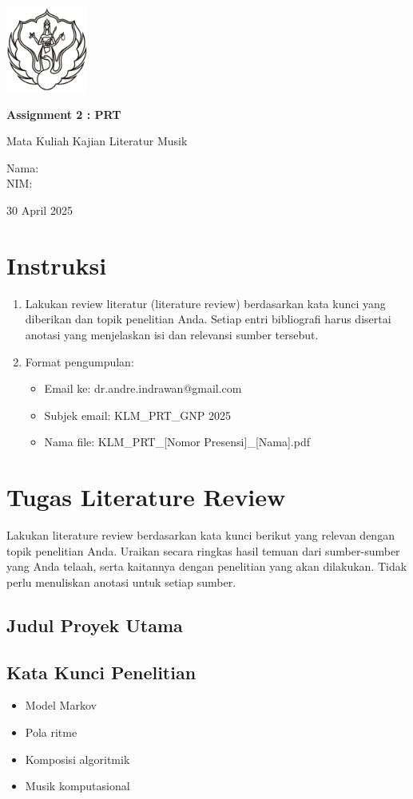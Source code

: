 \documentclass[a4paper,12pt]{article}
\newcommand{\AssignmentTitle}{Assignment 2 : PRT}
\renewcommand{\maketitle}{
  \begin{titlepage}
    \centering
    \includegraphics[width=0.2\textwidth]{../images/logo.png}\par\vspace{1cm}
    {\Huge\bfseries \AssignmentTitle}\par\vspace{0.5em}
    {\Large Mata Kuliah Kajian Literatur Musik}\par\vspace{2cm}
    {\large Nama: \AuthorName\\NIM: \AuthorNIM}\par\vspace{1cm}
    {\large 30 April 2025}\par
  \end{titlepage}
}
\begin{document}
\maketitle

\section*{Instruksi}
\begin{enumerate}
    \item Lakukan review literatur (literature review) berdasarkan kata kunci yang diberikan dan topik penelitian Anda. Setiap entri bibliografi harus disertai anotasi yang menjelaskan isi dan relevansi sumber tersebut.
    \item Format pengumpulan:
    \begin{itemize}
        \item Email ke: dr.andre.indrawan@gmail.com
        \item Subjek email: KLM\_PRT\_GNP 2025
        \item Nama file: KLM\_PRT\_[Nomor Presensi]\_[Nama].pdf
    \end{itemize}
\end{enumerate}

\section*{Tugas Literature Review}
Lakukan literature review berdasarkan kata kunci berikut yang relevan dengan topik penelitian Anda. Uraikan secara ringkas hasil temuan dari sumber-sumber yang Anda telaah, serta kaitannya dengan penelitian yang akan dilakukan. Tidak perlu menuliskan anotasi untuk setiap sumber.

\subsection*{Judul Proyek Utama}
\ThesisTitle

\subsection*{Kata Kunci Penelitian}
\begin{itemize}
    \item Model Markov
    \item Pola ritme
    \item Komposisi algoritmik
    \item Musik komputasional
\end{itemize}

\vspace{1cm}

\vspace{1cm}
\end{document}

